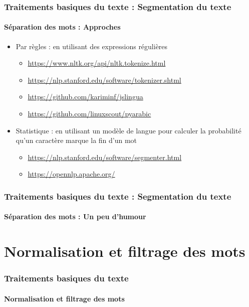 \documentclass[xcolor=table]{beamer}
\begin{document}
\begin{frame}
\frametitle{Traitements basiques du texte : Segmentation du texte}
\framesubtitle{Séparation des mots : Approches}

\begin{itemize}
	\item Par règles : en utilisant des expressions régulières 
	\begin{itemize}
		\item \url{https://www.nltk.org/api/nltk.tokenize.html}
		\item \url{https://nlp.stanford.edu/software/tokenizer.shtml}
		\item \url{https://github.com/kariminf/jslingua}
		\item \url{https://github.com/linuxscout/pyarabic}
	\end{itemize}
	\item Statistique : en utilisant un modèle de langue pour calculer la probabilité qu'un caractère marque la  fin d'un mot 
	\begin{itemize}
		\item \url{https://nlp.stanford.edu/software/segmenter.html}
		\item \url{https://opennlp.apache.org/}
	\end{itemize}
\end{itemize}

\end{frame}

\begin{frame}
\frametitle{Traitements basiques du texte : Segmentation du texte}
\framesubtitle{Séparation des mots : Un peu d'humour} 

\begin{center}
\end{center}

\end{frame}


\section{Normalisation et filtrage des mots}

\begin{frame}
\frametitle{Traitements basiques du texte}
\framesubtitle{Normalisation et filtrage des mots}


\end{frame}
\end{document}
